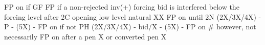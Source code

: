 FP on if GF
FP if a non-rejected inv(+) forcing bid is interfered below the forcing level  
after 2C opening
low level natural XX FP on until 2N
(2X/3X/4X) - P - (5X) - FP on if not PH
(2X/3X/4X) - bid/X - (5X) - FP on
# however, not necessarily FP on after a pen X or converted pen X